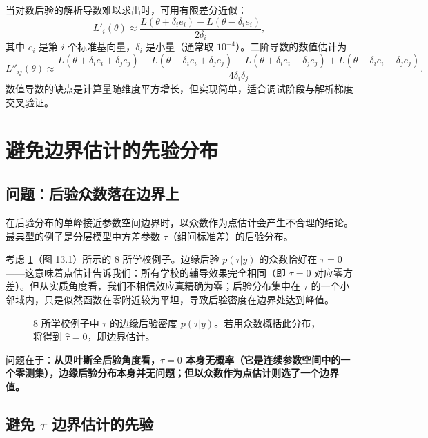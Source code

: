 当对数后验的解析导数难以求出时，可用有限差分近似：
\begin{equation}\label{eq:numerical-first-derivative}
L'_i(\theta) \approx \frac{L(\theta + \delta_i e_i) - L(\theta - \delta_i e_i)}{2\delta_i},
\end{equation}
其中 $e_i$ 是第 $i$ 个标准基向量，$\delta_i$ 是小量（通常取 $10^{-4}$）。二阶导数的数值估计为
\begin{equation}\label{eq:numerical-second-derivative}
L''_{ij}(\theta) \approx \frac{L(\theta + \delta_i e_i + \delta_j e_j) - L(\theta - \delta_i e_i + \delta_j e_j) - L(\theta + \delta_i e_i - \delta_j e_j) + L(\theta - \delta_i e_i - \delta_j e_j)}{4\delta_i \delta_j}.
\end{equation}
数值导数的缺点是计算量随维度平方增长，但实现简单，适合调试阶段与解析梯度交叉验证。

\section{避免边界估计的先验分布}\label{sec:boundary-avoiding-priors}

\subsection{问题：后验众数落在边界上}\label{sec:mode-on-boundary}

在后验分布的单峰接近参数空间边界时，以众数作为点估计会产生不合理的结论。最典型的例子是分层模型中方差参数 $\tau$（组间标准差）的后验分布。

考虑 \cref{fig:tau-posterior}（图 13.1）所示的 8 所学校例子。边缘后验 $p(\tau|y)$ 的众数恰好在 $\tau = 0$——这意味着点估计告诉我们：所有学校的辅导效果完全相同（即 $\tau = 0$ 对应零方差）。但从实质角度看，我们不相信效应真精确为零；后验分布集中在 $\tau$ 的一个小邻域内，只是似然函数在零附近较为平坦，导致后验密度在边界处达到峰值。

\begin{figure}[htbp]
\centering
\caption{8 所学校例子中 $\tau$ 的边缘后验密度 $p(\tau|y)$。若用众数概括此分布，将得到 $\hat{\tau} = 0$，即边界估计。}\label{fig:tau-posterior}
\end{figure}

问题在于：\textbf{从贝叶斯全后验角度看，$\tau = 0$ 本身无概率（它是连续参数空间中的一个零测集），边缘后验分布本身并无问题；但以众数作为点估计则选了一个边界值。}

\subsection{避免 $\tau$ 边界估计的先验}\label{sec:zero-avoiding-prior-tau}

